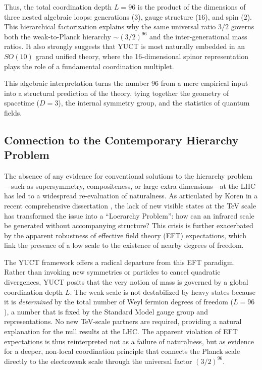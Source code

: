 \documentclass[11pt,a4paper]{article}
\begin{document}
	Thus, the total coordination depth \(L = 96\) is the product of the dimensions of three nested algebraic loops: generations (\(3\)), gauge structure (\(16\)), and spin (\(2\)). This hierarchical factorization explains why the same universal ratio \(3/2\) governs both the weak-to-Planck hierarchy \(\sim (3/2)^{96}\) and the inter-generational mass ratios. It also strongly suggests that YUCT is most naturally embedded in an \(SO(10)\) grand unified theory, where the 16-dimensional spinor representation plays the role of a fundamental coordination multiplet.
	
	This algebraic interpretation turns the number 96 from a mere empirical input into a structural prediction of the theory, tying together the geometry of spacetime (\(D=3\)), the internal symmetry group, and the statistics of quantum fields.
	
	\subsection{Connection to the Contemporary Hierarchy Problem}
	
	The absence of any evidence for conventional solutions to the hierarchy problem—such as supersymmetry, compositeness, or large extra dimensions—at the LHC has led to a widespread re-evaluation of naturalness. As articulated by Koren in a recent comprehensive dissertation \cite{Koren2020}, the lack of new visible states at the TeV scale has transformed the issue into a ``Loerarchy Problem'': how can an infrared scale be generated without accompanying structure? This crisis is further exacerbated by the apparent robustness of effective field theory (EFT) expectations, which link the presence of a low scale to the existence of nearby degrees of freedom.
	
	The YUCT framework offers a radical departure from this EFT paradigm. Rather than invoking new symmetries or particles to cancel quadratic divergences, YUCT posits that the very notion of mass is governed by a global coordination depth \(L\). The weak scale is not destabilized by heavy states because it is \emph{determined} by the total number of Weyl fermion degrees of freedom (\(L=96\)), a number that is fixed by the Standard Model gauge group and representations. No new TeV-scale partners are required, providing a natural explanation for the null results at the LHC. The apparent violation of EFT expectations is thus reinterpreted not as a failure of naturalness, but as evidence for a deeper, non-local coordination principle that connects the Planck scale directly to the electroweak scale through the universal factor \((3/2)^{96}\).
	
\end{document}

